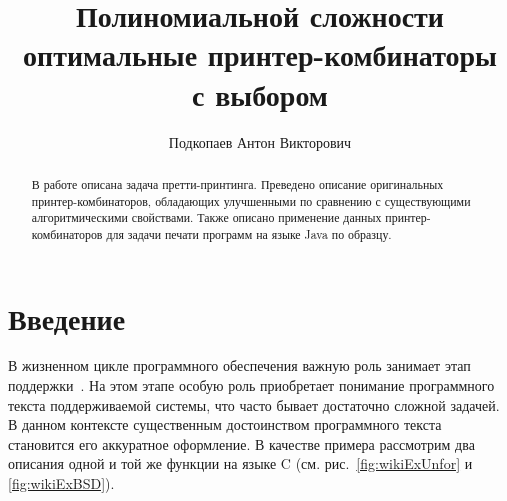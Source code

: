 \graphicspath{{Podkopaev/images/}}%



\title{Полиномиальной сложности\\
оптимальные принтер-комбинаторы\\ 
с выбором}
%
\author{Подкопаев Антон Викторович}
%
%
%

\maketitle              %

\begin{abstract}
В работе описана задача претти-принтинга. Преведено описание оригинальных
принтер-комбинаторов, обладающих улучшенными по сравнению с существующими алгоритмическими свойствами.
Также описано применение данных принтер-комбинаторов для задачи печати программ на
языке Java по образцу.
\end{abstract}

\section*{Введение}

В жизненном цикле программного обеспечения важную роль занимает этап
поддержки~\cite{maintance}. На этом этапе особую роль приобретает
понимание программного текста поддерживаемой системы, что часто бывает
достаточно сложной задачей. В данном контексте существенным достоинством
программного текста становится его аккуратное оформление.
В качестве примера рассмотрим два описания одной и той же функции на языке C
(см. рис.~\ref{fig:wikiExUnfor} и \ref{fig:wikiExBSD}).

